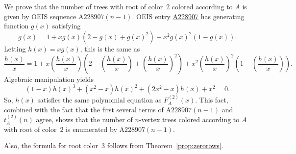 \documentclass[12pt]{amsart}
\newcommand{\seqnum}[1]{\href{https://oeis.org/#1}{#1}}
\newcommand{\gff}[2]{F_{#2}^{(#1)}(x)}
\newcommand{\gfa}[1]{\gff{#1}{A}}
\begin{document}
\begin{description}
\begin{itemize}
\end{itemize}
    \item[Discussion] We prove that the number of trees with root of color~2 colored according to $A$ is given by OEIS sequence $\text{A228907}(n-1)$.
    OEIS entry \seqnum{A228907} has generating function $g(x)$ satisfying
    \[
    g(x) = 1 + xg(x)(2 - g(x) + g(x)^2) + x^2g(x)^2(1 - g(x)).
    \]
    Letting $h(x)=xg(x)$, this is the same as
    \[
    \frac{h(x)}{x} = 1 + x\left(\frac{h(x)}{x}\right)\left(2 - \left(\frac{h(x)}{x}\right) + \left(\frac{h(x)}{x}\right)^2\right) + x^2\left(\frac{h(x)}{x}\right)^2\left(1 - \left(\frac{h(x)}{x}\right)\right).
    \]
    Algebraic manipulation yields
    \[
    (1 - x)h(x)^3+(x^2 - x)h(x)^2+(2x^2 - x)h(x)+x^2=0.
    \]
    So, $h(x)$ satisfies the same polynomial equation as $\gfa{2}$. This fact, combined with the fact that the first several terms of $\text{A228907}(n-1)$ and $t_A^{(2)}(n)$ agree, shows that the number of $n$-vertex trees colored according to $A$ with root of color~2 is enumerated by $\text{A228907}(n-1)$.

    Also, the formula for root color~$3$ follows from Theorem~\ref{prop:zerorows}.
\end{description}
\end{document}
